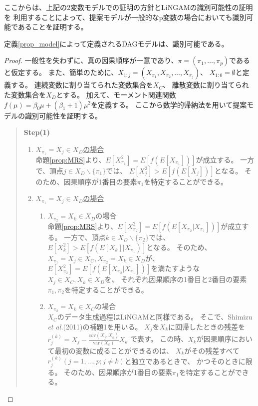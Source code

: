 ここからは、上記の2変数モデルでの証明の方針とLiNGAMの識別可能性の証明\cite{Shimizu2011-pd}を
利用することによって、提案モデルが一般的なp変数の場合においても識別可能であることを証明する。

\begin{theo}[提案モデルの識別可能性]
  定義\ref{prop_model}によって定義されるDAGモデルは、識別可能である。
\end{theo}

\begin{proof}
  一般性を失わずに、真の因果順序が一意であり、$\pi = (\pi_1, \dots, \pi_p)$であると仮定する。
  また、簡単のために、$X_{1:j} = (X_{\pi_1}, X_{\pi_2}, \dots, X_{\pi_j})$、
  $X_{1:0} = \emptyset$と定義する。
  連続変数に割り当てられた変数集合を$X_C$、
  離散変数に割り当てられた変数集合を$X_D$とする。
  加えて、モーメント関連関数$f(\mu) = \beta_0 \mu + (\beta_1 + 1)\mu^2$を定義する。
  ここから数学的帰納法を用いて提案モデルの識別可能性を証明する。

  \begin{quote}
    \textbf{Step(1)}
    \begin{enumerate}[label=(\roman*)]
      \item
      \underline{$X_{\pi_1} = X_j \in X_D$の場合} \\
      命題\ref{prop:MRS}より、$E[X_{\pi_1}^2] = E[f(E[X_{\pi_1}])]$が成立する。
      一方で、頂点$j \in X_D \backslash \{\pi_1\}$では、
      $E[X_j^2] > E[f(E[X_j])]$となる。
      そのため、因果順序が1番目の要素$\pi_1$を特定することができる。

      \item
      \underline{$X_{\pi_1} = X_j \in X_D$の場合}
      \begin{enumerate}[label=(ii - \alph*)]
        \item
        $X_{\pi_2} = X_k \in X_D$の場合 \\
        命題\ref{prop:MRS}より、$E[X_{\pi_2}^2] = E[f(E[X_{\pi_2} | X_{\pi_1}])]$が成立する。
        一方で、頂点$k \in X_D \backslash \{\pi_2\}$では、
        $E[X_k^2] > E[f(E[X_k] | X_{\pi_1})]$となる。
        そのため、$X_{\pi_1} = X_j \in X_C, X_{\pi_2} = X_k \in X_D$が、
        $E[X_{\pi_2}^2] = E[f(E[X_{\pi_2} | X_{\pi_1}])]$を満たすような
        $X_j \in X_C, X_k \in X_D$を、
        それぞれ因果順序の1番目と2番目の要素$\pi_1, \pi_2$を特定することができる。

        \item
        $X_{\pi_2} = X_k \in X_C$の場合 \\
        $X_C$のデータ生成過程はLiNGAM\cite{Shimizu2006-yu}と同様である。
        そこで、Shimizu \textit{et al.}(2011)\cite{Shimizu2011-pd}の補題1を用いる。
        $X_j$を$X_k$に回帰したときの残差を
        $r_j^{(k)} = X_j - \frac{\text{cov}(X_j, X_k)}{\text{var}(X_k)} X_k$
        で表す。
        この時、$X_k$が因果順序において最初の変数に成ることができるのは、
        $X_k$がその残差すべて$r_j^{(k)} (j = 1,\dots,p; j \neq k)$と独立であるときで、
        かつそのときに限る。
        そのため、因果順序が1番目の要素$\pi_1$を特定することができる。


\end{enumerate}
\end{enumerate}
\end{quote}
\end{proof}
